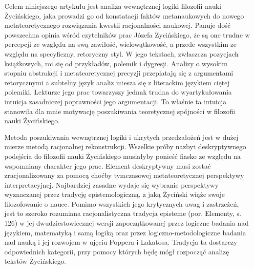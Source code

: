 \documentclass{article}
\begin{document}
Celem niniejszego artykułu jest analiza wewnętrznej logiki filozofii nauki Życińskiego, jaka prowadzi go od konstatacji
faktów metanaukowych do nowego metateoretycznego rozwiązania kwestii racjonalności naukowej. Panuje dość powszechna
opinia wśród czytelników prac Józefa Życińskiego, że są one trudne w percepcji ze względu na swą zawiłość,
wielowątkowość, a przede wszystkim ze względu na specyficzny, retoryczny styl. W jego tekstach, zwłaszcza pozycjach
książkowych, roi się od przykładów, polemik i dygresji. Analizy o wysokim stopniu abstrakcji i metateoretycznej
precyzji przeplatają się z argumentami retorycznymi a subtelny język analiz miesza się z literackim językiem ciętej
polemiki. Lekturze jego prac towarzyszy jednak trudna do wyartykułowania intuicja zasadniczej poprawności jego
argumentacji. To właśnie ta intuicja stanowiła dla mnie motywację poszukiwania teoretycznej spójności w filozofii nauki
Życińskiego.

Metoda poszukiwania wewnętrznej logiki i ukrytych przedzałożeń jest w dużej mierze metodą racjonalnej rekonstrukcji.
Wszelkie próby nazbyt deskryptywnego podejścia do filozofii nauki Życińskiego musiałyby ponieść fiasko ze względu na
wspomniany charakter jego prac. Element deskryptywny musi zostać zracjonalizowany za pomocą choćby tymczasowej
metateoretycznej perspektywy interpretacyjnej. Najbardziej zasadne wydaje się wybranie perspektywy wyznaczanej przez
tradycję epistemologiczną, z jaką Życiński wiąże swoje filozofowanie o nauce. Pomimo wszystkich jego krytycznych uwag i
zastrzeżeń, jest to szeroko rozumiana racjonalistyczna tradycja episteme (por. Elementy, s. 126) w jej
dwudziestowiecznej wersji zapoczątkowanej przez logiczne badania nad językiem, matematyką i samą logiką oraz przez
logiczno-metodologiczne badania nad nauką i jej rozwojem w ujęciu Poppera i Lakatosa. Tradycja ta dostarczy
odpowiednich kategorii, przy pomocy których będę mógł rozpocząć analizę tekstów Życińskiego. 
\end{document}

